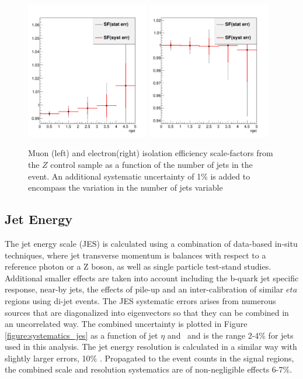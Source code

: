 \begin{figure}[htbp]
\begin{center}
\includegraphics[width=0.48\textwidth]{figs/systematics/MuTP_sf_njet_ALP}
\includegraphics[width=0.48\textwidth]{figs/systematics/EleTP_sf_njet_ALP}
\caption{Muon (left) and electron(right) isolation efficiency scale-factors from the $Z$ control sample as a function of the number of jets in the event. An additional systematic uncertainty of 1\% is added to encompass the variation in the number of jets variable}
\label{figure:systematics_iso}
\end{center}
\end{figure}


\subsection{Jet Energy}

The jet energy scale (JES) is calculated using a combination of data-based in-situ techniques, where jet transverse momentum is balances with respect to a reference photon or a Z boson, as well as single particle test-stand studies\cite{Aad:2014bia}. Additional smaller effects are taken into account including the b-quark jet specific response, near-by jets, the effects of pile-up and an inter-calibration of similar $eta$ regions using di-jet events. The JES systematic errors arises from numerous sources that are diagonalized into eigenvectors so that they can be combined in an uncorrelated way. The combined uncertainty is plotted in Figure \ref{figure:systematics_jes} as a function of jet $\eta$ and \pt\ and is the range 2-4\% for jets used in this analysis. The jet energy resolution is calculated in a similar way with slightly larger errors, 10\% \cite{Aad:2012ag}. Propagated to the event counts in the signal regions, the combined scale and resolution systematics are of non-negligible effects 6-7\%.  

